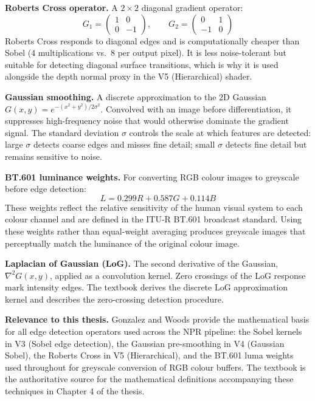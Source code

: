 \documentclass[11pt, a4paper]{article}
\begin{document}
\textbf{Roberts Cross operator.} A $2\times2$ diagonal gradient operator:
\[
  G_1 = \begin{pmatrix} 1 & 0 \\ 0 & -1 \end{pmatrix}, \qquad G_2 = \begin{pmatrix} 0 & 1 \\ -1 & 0 \end{pmatrix}
\]
Roberts Cross responds to diagonal edges and is computationally cheaper than Sobel (4 multiplications vs.\ 8 per output pixel). It is less noise-tolerant but suitable for detecting diagonal surface transitions, which is why it is used alongside the depth normal proxy in the V5 (Hierarchical) shader.

\textbf{Gaussian smoothing.} A discrete approximation to the 2D Gaussian $G(x,y) = e^{-(x^2+y^2)/2\sigma^2}$. Convolved with an image before differentiation, it suppresses high-frequency noise that would otherwise dominate the gradient signal. The standard deviation $\sigma$ controls the scale at which features are detected: large $\sigma$ detects coarse edges and misses fine detail; small $\sigma$ detects fine detail but remains sensitive to noise.

\textbf{BT.601 luminance weights.} For converting RGB colour images to greyscale before edge detection:
\[
  L = 0.299 R + 0.587 G + 0.114 B
\]
These weights reflect the relative sensitivity of the human visual system to each colour channel and are defined in the ITU-R BT.601 broadcast standard. Using these weights rather than equal-weight averaging produces greyscale images that perceptually match the luminance of the original colour image.

\textbf{Laplacian of Gaussian (LoG).} The second derivative of the Gaussian, $\nabla^2 G(x,y)$, applied as a convolution kernel. Zero crossings of the LoG response mark intensity edges. The textbook derives the discrete LoG approximation kernel and describes the zero-crossing detection procedure.

\textbf{Relevance to this thesis.} Gonzalez and Woods provide the mathematical basis for all edge detection operators used across the NPR pipeline: the Sobel kernels in V3 (Sobel edge detection), the Gaussian pre-smoothing in V4 (Gaussian Sobel), the Roberts Cross in V5 (Hierarchical), and the BT.601 luma weights used throughout for greyscale conversion of RGB colour buffers. The textbook is the authoritative source for the mathematical definitions accompanying these techniques in Chapter 4 of the thesis.
\end{document}
